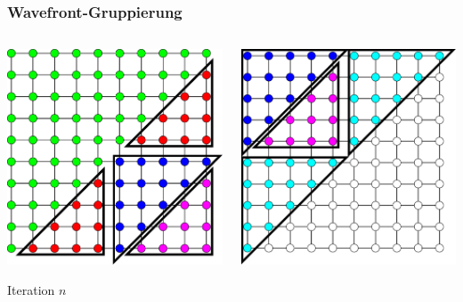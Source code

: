 \documentclass{beamer}
\begin{document}
\begin{frame}
    \frametitle{Wavefront-Gruppierung}
    \begin{columns}
        \begin{column}{0.5\textwidth}
            \includegraphics[width=\textwidth]{triangles1}
            \begin{center}
                Iteration $n$
            \end{center}
        \end{column}
        \begin{column}{0.5\textwidth}
            \includegraphics[width=\textwidth]{triangles2}

\end{column}
\end{columns}
\end{frame}
\end{document}
